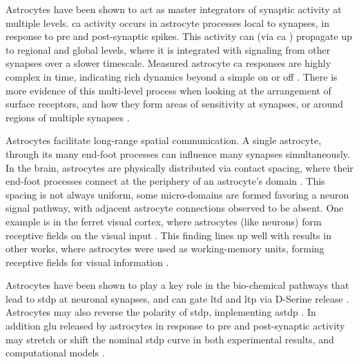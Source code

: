 \documentclass[conference]{IEEEtran}
\newcommand{\ca}{\gls{ca}\textrm{ }}
\begin{document}
Astrocytes have been shown to act as master integrators of synaptic activity at
multiple levels. \ca activity occurs in astrocyte processes local to synapses,
in response to pre and post-synaptic spikes. This activity can (via \ca)
propagate up to regional and global levels, where it is integrated with
signaling from other synapses over a slower timescale. Measured astrocyte \ca
responses are highly complex in time, indicating rich dynamics beyond a simple
on or off \parencite{araque_2014}. There is more evidence of this multi-level
process when looking at the arrangement of surface receptors, and how they form
areas of sensitivity at synapses, or around regions of multiple synapses
\parencite{pitta_2012}.

Astrocytes facilitate long-range spatial communication. A single astrocyte,
through its many end-foot processes can influence many synapses
simultaneously. In the brain, astrocytes are physically distributed via contact
spacing, where their end-foot processes connect at the periphery of an
astrocyte's domain \parencite{pitta_2012}. This spacing is not always uniform,
some micro-domains are formed favoring a neuron signal pathway, with adjacent
astrocyte connections observed to be absent. One example is in the ferret visual
cortex, where astrocytes (like neurons) form receptive fields on the visual
input \parencite{pitta_2012}. This finding lines up well with results in other
works, where astrocytes were used as working-memory units, forming receptive
fields for visual information \parencite{gordleeva_2021}.


Astrocytes have been shown to play a key role in the bio-chemical pathways that
lead to \gls{stdp} at neuronal synapses, and can gate \gls{ltd} and \gls{ltp}
via D-Serine release \parencite{manninen_2019}. Astrocytes may also reverse the
polarity of \gls{stdp}, implementing \gls{astdp} \parencite{min_2012}. In
addition \Gls{glu} released by astrocytes in response to pre and post-synaptic
activity may stretch or shift the nominal \gls{stdp} curve in both experimental
results, and computational models \parencite{pitta_2016}.
\end{document}
